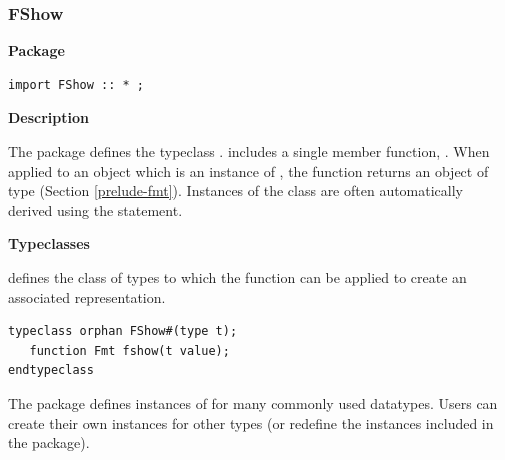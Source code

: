 \subsubsection{FShow}
\label{package-fshow}

{\bf Package}

\begin{verbatim}
import FShow :: * ;
\end{verbatim}




{\bf Description}

The  package defines the typeclass .  
includes a single member function, .  When applied to an
object which is an instance of , the  function
returns an object of type  (Section \ref{prelude-fmt}).
Instances of the  class are often automatically derived
using the  statement.


{\bf Typeclasses}

 defines the class of types to which the function 
can be applied to create an associated  representation.

\begin{verbatim}
typeclass orphan FShow#(type t);
   function Fmt fshow(t value);
endtypeclass
\end{verbatim}


The package defines instances of  for many commonly used
datatypes.  Users can create their own  instances for other types
(or redefine the instances included in the  package). 

